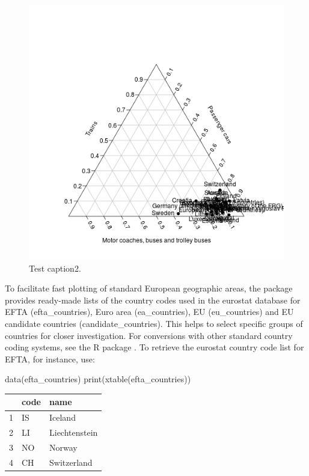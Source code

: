 \begin{figure}
\begin{center}
\includegraphics{2015-manu-search2-1}
\end{center}
\caption{Test caption2.}
\label{fig:plotrix}
\end{figure}

To facilitate fast plotting of standard European geographic areas, the package provides ready-made lists of the country codes used in the eurostat database for EFTA (efta\_countries), Euro area (ea\_countries), EU (eu\_countries) and EU candidate countries (candidate\_countries). This helps to select specific groups of countries for closer investigation. For conversions with other standard country coding systems, see the  R package \citep{countrycode}. To retrieve the eurostat country code list for EFTA, for instance, use:

\begin{example}
data(efta\_countries)
print(xtable(efta\_countries))
\end{example}

\begin{table}[ht]
\centering
\begin{tabular}{rll}
  \hline
 & code & name \\ 
  \hline
1 & IS & Iceland \\ 
  2 & LI & Liechtenstein \\ 
  3 & NO & Norway \\ 
  4 & CH & Switzerland \\ 
   \hline
\end{tabular}
\end{table}



